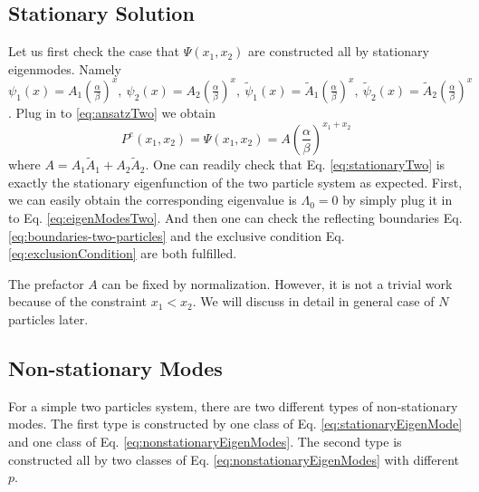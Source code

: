 \documentclass[12pt,a4paper]{article}
\begin{document}
\subsection{Stationary Solution}
\label{sub:stationary_soution}
Let us first check the case that $\Psi(x_1, x_2)$ are constructed all by
stationary eigenmodes. Namely $
\psi_1(x) = A_1\left(\frac{\alpha}{\beta}\right)^x,
~\psi_2(x) = A_2\left(\frac{\alpha}{\beta}\right)^x,
~\tilde{\psi}_1(x) = \tilde{A}_1\left(\frac{\alpha}{\beta}\right)^x,
~\tilde{\psi}_2(x) = \tilde{A}_2\left(\frac{\alpha}{\beta}\right)^x$. 
Plug in to \eqref{eq:ansatzTwo} we obtain
\begin{equation}
    \label{eq:stationaryTwo}
    P^e(x_1, x_2) = \Psi(x_1, x_2) = 
    A \left(\frac{\alpha}{\beta}\right)^{x_1+x_2}
\end{equation}
where $A=A_1\tilde{A}_1+A_2\tilde{A}_2$. One can readily check that Eq.
\eqref{eq:stationaryTwo} is exactly the stationary eigenfunction of the two
particle system as expected. First, we can easily obtain the corresponding
eigenvalue is $\Lambda_0=0$ by simply plug it in to Eq. \eqref{eq:eigenModesTwo}.
And then one can check the reflecting boundaries Eq.
\eqref{eq:boundaries-two-particles} and the exclusive condition Eq.
\eqref{eq:exclusionCondition} are both fulfilled. 

The prefactor $A$ can be fixed by normalization. However, it is not a trivial
work because of the constraint $x_1 < x_2$. We will discuss in detail in
general case of $N$ particles later. 

\subsection{Non-stationary Modes}
\label{sub:non_stationary_modes}

For a simple two particles system, there are two different types of
non-stationary modes. The first type is constructed by one class of Eq.
\eqref{eq:stationaryEigenMode} and one class of Eq.
\eqref{eq:nonstationaryEigenModes}. The second type is constructed all by two
classes of Eq. \eqref{eq:nonstationaryEigenModes} with different $p$.
\end{document}
